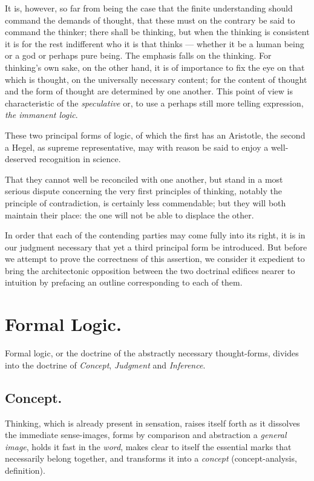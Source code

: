 \documentclass[12pt]{book}
\begin{document}
It is, however, so far from being the case that the finite
understanding should command the demands of thought, that these must
on the contrary be said to command the thinker; there shall be
thinking, but when the thinking is consistent it is for the rest
indifferent who it is that thinks --- whether it be a human being or
a god or perhaps pure being. The emphasis falls on the thinking. For
thinking's own sake, on the other hand, it is of importance to fix
the eye on that which is thought, on the universally necessary
content; for the content of thought and the form of thought are
determined by one another. This point of view is characteristic of
the \emph{speculative} or, to use a perhaps still more telling
expression, \emph{the immanent logic}.

These two principal forms of logic, of which the first has an
Aristotle, the second a Hegel, as supreme representative, may with
reason be said to enjoy a well-deserved recognition in science.

That they cannot well be reconciled with one another, but stand in a
most serious dispute concerning the very first principles of
thinking, notably the principle of contradiction, is certainly less
commendable; but they will both maintain their place: the one will
not be able to displace the other.

In order that each of the contending parties may come fully into its
right, it is in our judgment necessary that yet a third principal
form be introduced. But before we attempt to prove the correctness of
this assertion, we consider it expedient to bring the architectonic
opposition between the two doctrinal edifices nearer to intuition by
prefacing an outline corresponding to each of them.

\section*{Formal Logic.}

Formal logic, or the doctrine of the abstractly necessary
thought-forms, divides into the doctrine of \emph{Concept},
\emph{Judgment} and \emph{Inference}.

\subsection*{Concept.}

Thinking, which is already present in sensation, raises itself forth
as it dissolves the immediate sense-images, forms by comparison and
abstraction a \emph{general image}, holds it fast in the \emph{word},
makes clear to itself the essential marks that necessarily belong
together, and transforms it into a \emph{concept} (concept-analysis,
definition).
\end{document}

